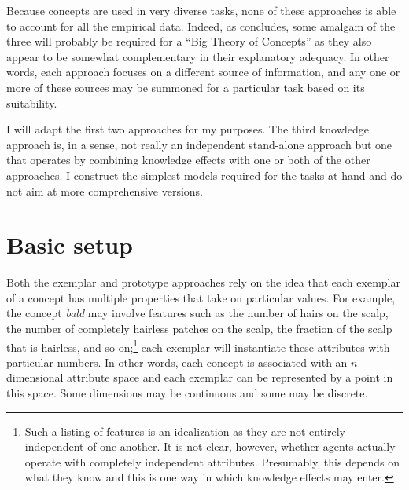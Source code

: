 Because concepts are used in very diverse tasks, none of these approaches is able to account for all the empirical data. Indeed, as \citet[Chapter~13]{murphy:bbc} concludes, some amalgam of the three will probably be required for a ``Big Theory of Concepts'' as they also appear to be somewhat complementary in their explanatory adequacy. In other words, each approach focuses on a different source of information, and any one or more of these sources may be summoned for a particular task based on its suitability.


I will adapt the first two approaches for my purposes. The third knowledge approach is, in a sense, not really an independent stand-alone approach but one that operates by combining knowledge effects with one or both of the other approaches. I construct the simplest models required for the tasks at hand and do not aim at more comprehensive versions.

\section{Basic setup}

Both the exemplar and prototype approaches rely on the idea that each exemplar of a concept has multiple properties that take on particular values. For example, the concept \emph{bald} may involve features such as the number of hairs on the scalp, the number of completely hairless patches on the scalp, the fraction of the scalp that is hairless, and so on;\footnote{Such a listing of features is an idealization as they are not entirely independent of one another. It is not clear, however, whether agents actually operate with completely independent attributes. Presumably, this depends on what they know and this is one way in which knowledge effects may enter.} each exemplar will instantiate these attributes with particular numbers. In other words, each concept is associated with an $n$-dimensional attribute space and each exemplar can be represented by a point in this space. Some dimensions may be continuous and some may be discrete.


